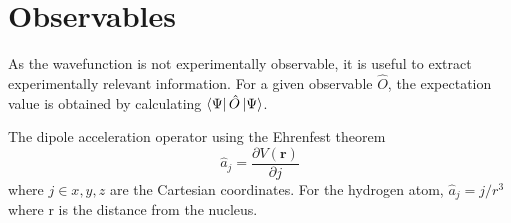 

\section{Observables} %
\label{sec:observables}

As the wavefunction is not experimentally observable, it is useful to extract experimentally relevant information. For a given observable $\hat{O}$, the expectation value is obtained by calculating $\bra{\Psi}\hat{O}\ket{\Psi}$.


The dipole acceleration operator using the Ehrenfest theorem
\begin{equation}
  \hat{a}_j =  \frac{\partial V(\mathbf{r})}{\partial j}
\end{equation}
where $j \in x, y, z$ are the Cartesian coordinates. For the hydrogen atom, $\hat{a}_j=j/r^3$ where r is the distance from the nucleus.

